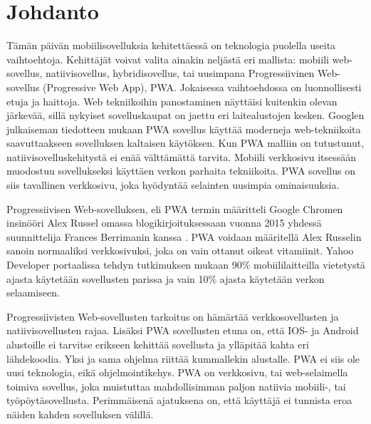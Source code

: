 \documentclass{tktltiki}
\begin{document}
\mytableofcontents

\section{Johdanto}

Tämän päivän mobiilisovelluksia kehitettäessä on teknologia puolella useita vaihtoehtoja. Kehittäjät voivat valita ainakin neljästä eri mallista: mobiili web-sovellus, natiivisovellus, hybridisovellus, tai uusimpana Progressiivinen Web-sovellus (Progressive Web App), PWA. Jokaisessa vaihtoehdossa on luonnollisesti etuja ja haittoja. Web tekniikoihin panostaminen näyttäisi kuitenkin olevan järkevää, sillä nykyiset sovelluskaupat on jaettu eri laitealustojen kesken. Googlen julkaiseman tiedotteen mukaan \cite{Gambhir} PWA sovellus käyttää moderneja web-tekniikoita saavuttaakseen sovelluksen kaltaisen käytöksen. Kun PWA malliin on tutustunut, natiivisovelluskehitystä ei enää välttämättä tarvita. Mobiili verkkosivu itsessään muodostuu sovellukseksi käyttäen verkon parhaita tekniikoita. PWA sovellus on siis tavallinen verkkosivu, joka hyödyntää selainten uusimpia ominaisuuksia.

Progressiivisen Web-sovelluksen, eli PWA termin määritteli Google Chromen insinööri Alex Russel \cite{Russell} \cite{biorn2017progressive} omassa blogikirjoituksessaan vuonna 2015 yhdessä suunnittelija Frances Berrimanin kanssa \cite{tandelimpact}. PWA voidaan määritellä Alex Russelin sanoin normaaliksi verkkosivuksi, joka on vain ottanut oikeat vitamiinit. Yahoo Developer portaalissa tehdyn tutkimuksen mukaan \cite{Khalaf} 90\% mobiililaitteilla vietetystä ajasta käytetään sovellusten parissa ja vain 10\% ajasta käytetään verkon selaamiseen. 

Progressiivisten Web-sovellusten tarkoitus on hämärtää verkkosovellusten ja natiivisovellusten rajaa. Lisäksi PWA sovellusten etuna on, että IOS- ja Android alustoille ei tarvitse erikseen kehittää sovellusta ja ylläpitää kahta eri lähdekoodia. Yksi ja sama ohjelma riittää kummallekin alustalle. PWA ei siis ole uusi teknologia, eikä ohjelmointikehys. PWA on verkkosivu, tai web-selaimella toimiva sovellus, joka muistuttaa mahdollisimman paljon natiivia mobiili-, tai työpöytäsovellusta. Perimmäisenä ajatuksena on, että käyttäjä ei tunnista eroa näiden kahden sovelluksen välillä.
\end{document}
